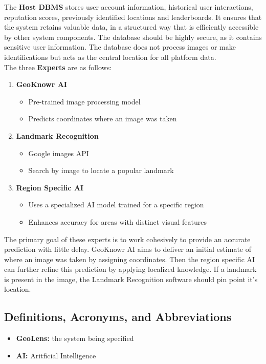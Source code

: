 \documentclass[]{article}
\begin{document}
The \textbf{Host DBMS} stores user account information, historical user interactions, reputation scores, previously identified locations and leaderboards. It ensures that the system retains valuable data,
in a structured way that is efficiently accessible by other system components. The database should be highly secure, as it contains sensitive user information. The database does not process images or make
identifications but acts as the central location for all platform data. \\

The three \textbf{Experts} are as follows:
\begin{enumerate}
    \item \textbf{GeoKnowr AI}
    \begin{itemize}
        \item Pre-trained image processing model
        \item Predicts coordinates where an image was taken
    \end{itemize}
    \item \textbf{Landmark Recognition}
    \begin{itemize}
        \item Google images API
        \item Search by image to locate a popular landmark
    \end{itemize}
	\item \textbf{Region Specific AI}
	\begin{itemize}
        \item Uses a specialized AI model trained for a specific region
        \item Enhances accuracy for areas with distinct visual features
    \end{itemize}
\end{enumerate}

The primary goal of these experts is to work cohesively to provide an accurate prediction with little delay. GeoKnowr AI aims to deliver an initial estimate
of where an image was taken by assigning coordinates. Then the region specific AI can further refine this prediction by applying localized knowledge. If a landmark is 
present in the image, the Landmark Recognition software should pin point it's location.

\subsection{Definitions, Acronyms, and Abbreviations}
\label{sub:definitions_acronyms_and_abbreviations}
\begin{itemize}
	\item \textbf{GeoLens:} the system being specified
	\item \textbf{AI:} Aritficial Intelligence
\end{itemize}
\end{document}
